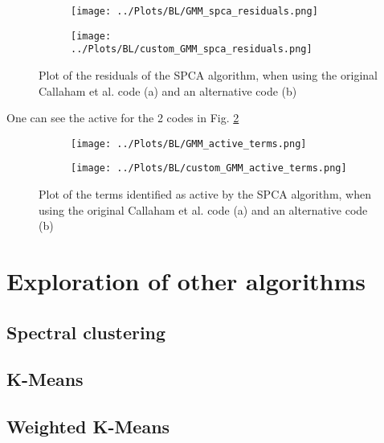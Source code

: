 \documentclass[12pt]{report} %
\begin{document}
\begin{figure}
  \centering
  \begin{subfigure}[b]{0.45\textwidth}
      \texttt{[image: ../Plots/BL/GMM\_spca\_residuals.png]}
      \caption{}
  \end{subfigure}
  \hfill
  \begin{subfigure}[b]{0.45\textwidth}
      \texttt{[image: ../Plots/BL/custom\_GMM\_spca\_residuals.png]}
      \caption{}
  \end{subfigure}
  \caption{Plot of the residuals of the SPCA algorithm, when using the original Callaham et al. code (a) and an alternative code (b)}
  \label{fig:SPCA_residuals}
\end{figure}


One can see the active for the 2 codes in Fig. \ref{fig:active_terms}


\begin{figure}[htbp]
  \centering
  \begin{subfigure}[b]{0.45\textwidth}
      \texttt{[image: ../Plots/BL/GMM\_active\_terms.png]}
      \caption{}
  \end{subfigure}
  \hfill
  \begin{subfigure}[b]{0.45\textwidth}
      \texttt{[image: ../Plots/BL/custom\_GMM\_active\_terms.png]}
      \caption{}
  \end{subfigure}

  \caption{Plot of the terms identified as active by the SPCA algorithm, when using the original Callaham et al. code (a) and an alternative code (b)}

\label{fig:active_terms}
\end{figure}


\section{Exploration of other algorithms}

\subsection{Spectral clustering}

\subsection{K-Means}

\subsection{Weighted K-Means}
\end{document}

